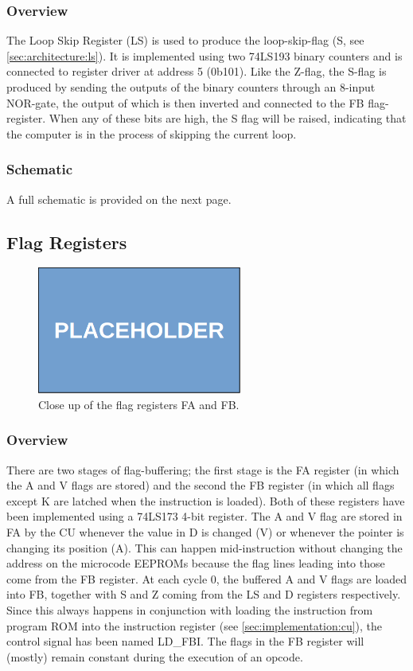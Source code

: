 \subsubsection{Overview}
The Loop Skip Register (LS) is used to produce the loop-skip-flag (S, see \ref{sec:architecture:ls}). It is implemented using two 74LS193 binary counters and is connected to register driver at address 5 (0b101). Like the Z-flag, the S-flag is produced by sending the outputs of the binary counters through an 8-input NOR-gate, the output of which is then inverted and connected to the FB flag-register. When any of these bits are high, the S flag will be raised, indicating that the computer is in the process of skipping the current loop.


\subsubsection{Schematic}
A full schematic is provided on the next page.




\subsection{Flag Registers}
\begin{figure}[H]
  \centering
  \includegraphics[width=0.6\textwidth]{img/placeholder}
  \caption{Close up of the flag registers FA and FB.}
  \label{fig:ramcloseup}
\end{figure}

\subsubsection{Overview}
There are two stages of flag-buffering; the first stage is the FA register (in which the A and V flags are stored) and the second the FB register (in which all flags except K are latched when the instruction is loaded). Both of these registers have been implemented using a 74LS173 4-bit register. The A and V flag are stored in FA by the CU whenever the value in D is changed (V) or whenever the pointer is changing its position (A). This can happen mid-instruction without changing the address on the microcode EEPROMs because the flag lines leading into those come from the FB register. At each cycle 0, the buffered A and V flags are loaded into FB, together with S and Z coming from the LS and D registers respectively. Since this always happens in conjunction with loading the instruction from program ROM into the instruction register (see \ref{sec:implementation:cu}), the control signal has been named LD\_FBI. The flags in the FB register will (mostly) remain constant during the execution of an opcode.

